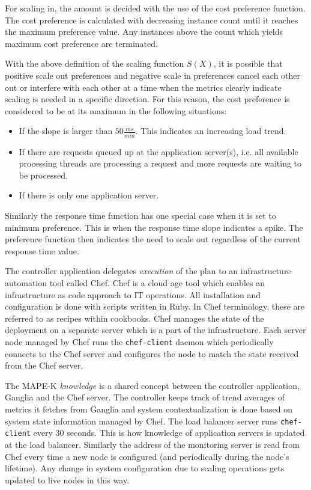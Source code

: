 \documentclass[english]{tktltiki2}
\theoremstyle{definition}
\theoremstyle{remark}
\begin{document}
For scaling in, the amount is decided with the use of the cost preference
function. The cost preference is calculated with decreasing instance count until
it reaches the maximum preference value. Any instances above the count which
yields maximum cost preference are terminated.

With the above definition of the scaling function $S(X)$, it is possible that
positive scale out preferences and negative scale in preferences cancel each
other out or interfere with each other at a time when the metrics clearly indicate scaling is needed in a specific direction. For this reason, the cost preference is considered to be at its maximum in the following situations:

\begin{itemize}
	\item{If the slope is larger than $50 \frac{ms}{min}$. This indicates an increasing load trend.}
	\item{If there are requests queued up at the application server(s), i.e. all available processing threads are processing a request and more requests are waiting to be processed.}
	\item{If there is only one application server.}
\end{itemize}

Similarly the response time function has one special case when it is set to minimum preference. This is when the response time slope indicates a spike. The preference function then indicates the need to scale out regardless of the current response time value.

The controller application delegates \textit{execution} of the plan to an
infrastructure automation tool called Chef. Chef is a cloud age tool which
enables an infrastructure as code approach to IT operations. All installation
and configuration is done with scripts written in Ruby. In Chef terminology,
these are referred to as recipes within cookbooks. Chef manages the state of the
deployment on a separate server which is a part of the infrastructure. Each
server node managed by Chef runs the \texttt{chef-client} daemon which
periodically connects to the Chef server and configures the node to match the
state received from the Chef server.

The MAPE-K \textit{knowledge} is a shared concept between the controller
application, Ganglia and the Chef server. The controller keeps track of trend
averages of metrics it fetches from Ganglia and system contextualization is done
based on system state information managed by Chef. The load balancer server runs
\texttt{chef-client} every 30 seconds. This is how knowledge of application
servers is updated at the load balancer. Similarly the address of the monitoring
server is read from Chef every time a new node is configured (and periodically
during the node's lifetime). Any change in system configuration due to scaling
operations gets updated to live nodes in this way.
\end{document}
